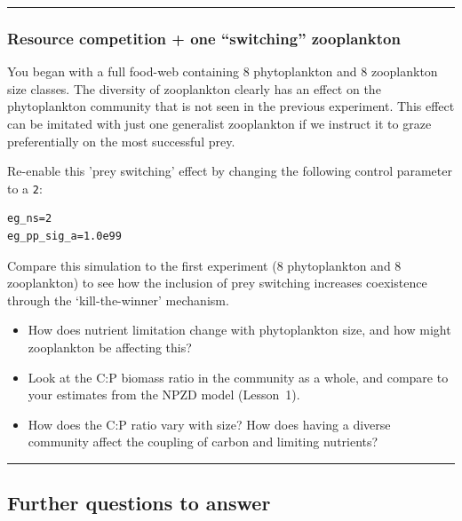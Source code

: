 \vspace{1mm}
\noindent\rule{4cm}{0.1mm}

\newpage
%
\subsubsection*{Resource competition + one ``switching'' zooplankton}
\vspace{1mm}

You began with a full food-web containing 8 phytoplankton and 8 zooplankton size classes. The diversity of zooplankton clearly has an effect on the phytoplankton community that is not seen in the previous experiment. This effect can be imitated with just one generalist zooplankton if we instruct it to graze preferentially on the most successful prey.

\vspace{1mm}
Re-enable this 'prey switching' effect by changing the following control parameter to a \texttt{2}:
\vspace{-1mm}\small\begin{verbatim}
eg_ns=2
eg_pp_sig_a=1.0e99
\end{verbatim}\normalsize\vspace{-1mm}
Compare this simulation to the first experiment (8 phytoplankton and 8 zooplankton) to see how the inclusion of prey switching increases coexistence through the `kill-the-winner' mechanism.

\vspace{1mm}
\begin{itemize}
\item How does nutrient limitation change with phytoplankton size, and how might zooplankton be affecting this?
\item Look at the C:P biomass ratio in the community as a whole, and compare to your estimates from the NPZD model (Lesson~1).
\item How does the C:P ratio vary with size? How does having a diverse community affect the coupling of carbon and limiting nutrients?
\end{itemize}

\vspace{1mm}
\noindent\rule{4cm}{0.1mm}

\subsection*{Further questions to answer}
\vspace{1mm}

